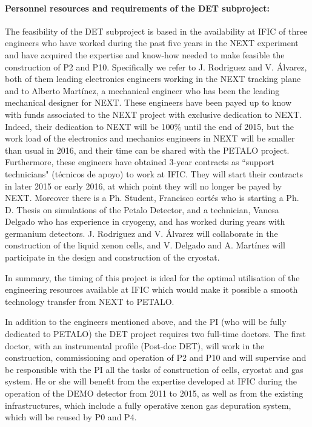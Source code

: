 \paragraph{Personnel resources and requirements of the DET subproject:}

The feasibility of the DET subproject is based in the availability at IFIC of three engineers who have worked during the past five years in the NEXT experiment and have acquired the expertise and know-how needed to make feasible the construction of P2 and P10. Specifically we refer to J. Rodriguez and V. Álvarez, both of them leading electronics engineers working in the NEXT tracking plane and to Alberto Martínez, a mechanical engineer who has been the leading mechanical designer for NEXT.
These engineers have been payed up to know with funds associated to the NEXT project with exclusive dedication to NEXT. Indeed, their dedication to NEXT will be 100\% until the end of 2015, but the work load of the electronics and mechanics engineers in NEXT will be smaller than usual in 2016, and their time can be shared with the PETALO project. Furthermore, these engineers have obtained 3-year contracts as ``support technicians" (técnicos de apoyo) to work at IFIC. They will start their contracts in later 2015 or early 2016, at which point they will no longer be payed by NEXT. 
Moreover there is a Ph. Student, Francisco cortés who is starting a Ph. D. Thesis on simulations of the Petalo Detector, and a technician, Vanesa Delgado who has experience in cryogeny, and has worked during years with germanium detectors. 
J. Rodriguez and V. Álvarez will collaborate in the construction of the liquid xenon cells, and  V. Delgado and A. Martínez  will participate in the design and construction of the cryostat.

In summary, the timing of this project is ideal for the optimal utilisation of the engineering resources available at IFIC which would make it possible a smooth technology transfer from NEXT to PETALO. 


In addition to the engineers mentioned above, and the PI (who will be fully dedicated to PETALO) the DET project requires two full-time doctors. The first doctor, with an instrumental profile (Post-doc DET), will work in the construction, commissioning and operation of P2 and P10 and will supervise and be responsible with the PI  all the tasks of construction of cells, cryostat and gas system. He or she will benefit from the expertise developed at IFIC during the operation of the DEMO detector from 2011 to 2015, as well as from the existing infrastructures, which include a fully operative xenon gas depuration system, which will be reused by P0 and P4. 

